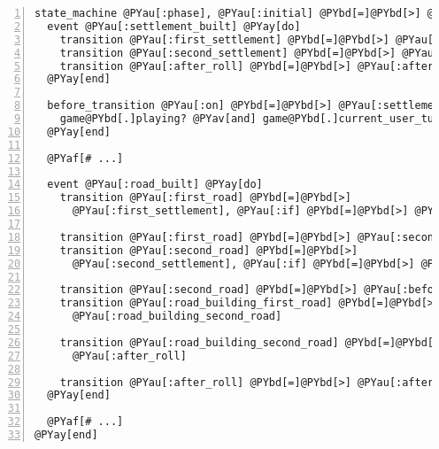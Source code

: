 \begin{Verbatim}[commandchars=@\[\],numbers=left,firstnumber=1,stepnumber=1]
state_machine @PYau[:phase], @PYau[:initial] @PYbd[=]@PYbd[>] @PYau[:first_settlement] @PYay[do]
  event @PYau[:settlement_built] @PYay[do]
    transition @PYau[:first_settlement] @PYbd[=]@PYbd[>] @PYau[:first_road]
    transition @PYau[:second_settlement] @PYbd[=]@PYbd[>] @PYau[:second_road]
    transition @PYau[:after_roll] @PYbd[=]@PYbd[>] @PYau[:after_roll]
  @PYay[end]

  before_transition @PYau[:on] @PYbd[=]@PYbd[>] @PYau[:settlement_built] @PYay[do] @PYbd[|]game, trans@PYbd[|]
    game@PYbd[.]playing? @PYav[and] game@PYbd[.]current_user_turn?(@PYbd[*]trans@PYbd[.]args)
  @PYay[end]

  @PYaf[# ...]

  event @PYau[:road_built] @PYay[do]
    transition @PYau[:first_road] @PYbd[=]@PYbd[>]
      @PYau[:first_settlement], @PYau[:if] @PYbd[=]@PYbd[>] @PYau[:next_player?]

    transition @PYau[:first_road] @PYbd[=]@PYbd[>] @PYau[:second_settlement]
    transition @PYau[:second_road] @PYbd[=]@PYbd[>]
      @PYau[:second_settlement], @PYau[:if] @PYbd[=]@PYbd[>] @PYau[:previous_player?]

    transition @PYau[:second_road] @PYbd[=]@PYbd[>] @PYau[:before_roll]
    transition @PYau[:road_building_first_road] @PYbd[=]@PYbd[>]
      @PYau[:road_building_second_road]

    transition @PYau[:road_building_second_road] @PYbd[=]@PYbd[>]
      @PYau[:after_roll]

    transition @PYau[:after_roll] @PYbd[=]@PYbd[>] @PYau[:after_roll]
  @PYay[end]

  @PYaf[# ...]
@PYay[end]
\end{Verbatim}
